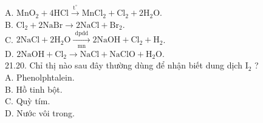 \documentclass[10pt]{article}
\begin{document}
A. $\mathrm{MnO}_{2}+4 \mathrm{HCl} \xrightarrow{\mathrm{t}^{\circ}} \mathrm{MnCl}_{2}+\mathrm{Cl}_{2}+2 \mathrm{H}_{2} \mathrm{O}$.\\
B. $\mathrm{Cl}_{2}+2 \mathrm{NaBr} \longrightarrow 2 \mathrm{NaCl}+\mathrm{Br}_{2}$.\\
C. $2 \mathrm{NaCl}+2 \mathrm{H}_{2} \mathrm{O} \xrightarrow[\text { mn }]{\text { dpdd }} 2 \mathrm{NaOH}+\mathrm{Cl}_{2}+\mathrm{H}_{2}$.\\
D. $2 \mathrm{NaOH}+\mathrm{Cl}_{2} \longrightarrow \mathrm{NaCl}+\mathrm{NaClO}+\mathrm{H}_{2} \mathrm{O}$.\\
21.20. Chỉ thị nào sau đây thường dùng để nhận biết dung dịch $\mathrm{I}_{2}$ ?\\
A. Phenolphtalein.\\
B. Hồ tinh bột.\\
C. Quỳ tím.\\
D. Nước vôi trong.
\end{document}
